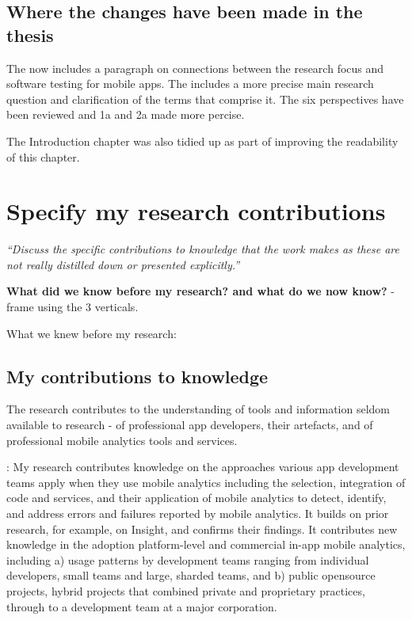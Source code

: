\subsection{Where the changes have been made in the thesis}
The  now includes a paragraph on connections between the research 
focus and software testing for  mobile apps. The  includes a more precise main research question and clarification of the terms that comprise it. The six perspectives have been reviewed and 1a and 2a made more percise.

The Introduction chapter was also tidied up as part of improving the readability of this chapter.


\section{Specify my research contributions}
\emph{``Discuss the specific contributions to knowledge that the work makes as these are not really distilled down or presented explicitly.''}

\textbf{What did we know before my research? and what do we now know?} - frame using the 3 verticals.

What we knew before my research:


\subsection{My contributions to knowledge}
The research contributes to the understanding of tools and information seldom available to research - of professional app developers, their artefacts, and of professional mobile analytics tools and services. 

: 
My research contributes knowledge on the approaches various app development teams apply when they use mobile analytics including the selection, integration of code and services, and their application of mobile analytics to detect, identify, and address errors and failures reported by mobile analytics. It builds on prior research, for example, on Insight, and confirms their findings. It contributes new knowledge in the adoption platform-level and commercial in-app mobile analytics, including a) usage patterns by development teams ranging from individual  developers, small teams and large,  sharded teams, and b) public opensource projects, hybrid projects that combined private and proprietary practices, through to a development team at a major corporation.


